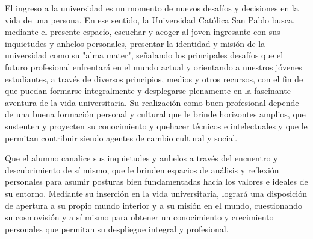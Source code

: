 \begin{syllabus}


\begin{justification}
El ingreso a la universidad es un momento de nuevos desafíos y decisiones en la vida de una persona. En ese sentido, la Universidad Católica San Pablo busca, mediante el presente espacio, escuchar y acoger al joven ingresante con sus inquietudes y anhelos personales, presentar la identidad y misión de la universidad como su "alma mater", señalando los principales desafíos que el futuro profesional enfrentará en el mundo actual  y orientando a nuestros jóvenes estudiantes, a través de diversos principios, medios y otros recursos, con el fin de que puedan formarse integralmente y desplegarse plenamente en la fascinante aventura de la vida universitaria.  Su realización como buen profesional depende de una buena formación personal y cultural que le brinde horizontes amplios, que sustenten y proyecten su conocimiento y quehacer técnicos e intelectuales y que le permitan contribuir siendo agentes de cambio cultural y social.
\end{justification}

\begin{goals}
\item Que el alumno canalice sus inquietudes y anhelos a través del encuentro y descubrimiento de sí mismo, que le brinden espacios de análisis y reflexión personales para asumir posturas bien fundamentadas hacia los valores e ideales de su entorno. Mediante su inserción en la vida universitaria, logrará una disposición de apertura a su propio mundo interior y a su misión en el mundo, cuestionando su cosmovisión y a sí mismo para obtener un conocimiento y crecimiento personales que permitan su despliegue integral y profesional. 
\end{goals}

\begin{outcomes}
\end{outcomes}


\end{syllabus}
